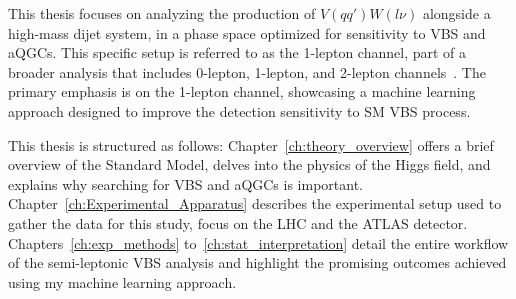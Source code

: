 This thesis focuses on analyzing the production of $V(qq')W(l\nu)$ alongside a high-mass dijet system, in a phase space optimized for sensitivity to VBS and aQGCs. This specific setup is referred to as the 1-lepton channel, part of a broader analysis that includes 0-lepton, 1-lepton, and 2-lepton channels~\cite{Charlton:2808769}. The primary emphasis is on the 1-lepton channel, showcasing a machine learning approach designed to improve the detection sensitivity to SM VBS process.

This thesis is structured as follows: Chapter~\ref{ch:theory_overview} offers a brief overview of the Standard Model, delves into the physics of the Higgs field, and explains why searching for VBS and aQGCs is important.
Chapter~\ref{ch:Experimental_Apparatus} describes the experimental setup used to gather the data for this study, focus on the LHC and the ATLAS detector. Chapters~\ref{ch:exp_methods} to~\ref{ch:stat_interpretation} detail the entire workflow of the semi-leptonic VBS analysis and highlight the promising outcomes achieved using my machine learning approach.



